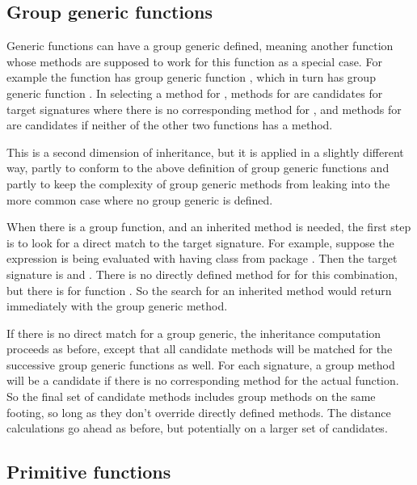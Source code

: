 \documentclass[11pt]{article}
\begin{document}
\subsection*{Group generic functions}
\label{sec:group-gener-funct}

Generic functions can have a group generic defined, meaning another function whose methods are supposed to work for this function as a special case.
For example the function \SOperator{+} has group generic function , which in turn has group generic function .
In selecting a method for \SOperator{+}, methods for  are candidates for target signatures where there is no corresponding method for \SOperator{+}, and methods for  are candidates if neither of the other two functions has a method.

This is a second dimension of inheritance, but it is applied in a slightly different way, partly to conform to the above definition of group generic functions and partly to keep the complexity of group generic methods from leaking into the more common case where no group generic is defined.

When there is a group function, and an inherited method is needed, the first step is to look for a direct match to the target signature.
For example, suppose the expression  is being evaluated with  having class  from package .
Then the target signature is  and .
There is no directly defined method for \SOperator{+} for this combination, but there is for function .
So the search for an inherited method would return immediately with the group generic method.

If there is no direct match for a group generic, the inheritance computation proceeds as before, except that all candidate methods will be matched for the successive group generic functions as well.
For each signature, a group method will be a candidate if there is no corresponding method for the actual function.
So the final set of candidate methods includes group methods on the same footing, so long as they don't override directly defined methods.
The distance calculations go ahead as before, but potentially on a larger set of candidates.

\subsection*{Primitive functions}
\label{sec:primitive-functions}
\end{document}
